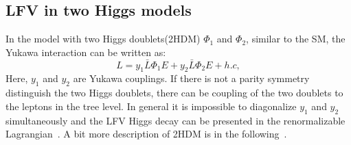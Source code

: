 \subsection{LFV in two Higgs models}

In the model with two Higgs doublets(2HDM) $\Phi_{1}$ and $\Phi_{2}$, similar to the SM, the Yukawa interaction can be written as: 
\begin{equation}
L=y_{1}\bar{L}\Phi_{1}E+y_{2}\bar{L}\Phi_{2}E+h.c,
\end{equation}
Here, $y_{1}$ and $y_{2}$ are Yukawa couplings. If there is not a parity symmetry distinguish the two Higgs doublets, there can be coupling of the two doublets to the leptons in the tree level. In general it is impossible to diagonalize $y_{1}$ and $y_{2}$ simultaneously and the LFV Higgs decay can be presented in the renormalizable Lagrangian~\cite{deLima2015}. A bit more description of 2HDM is in the following~\cite{BRANCO20121}.   


